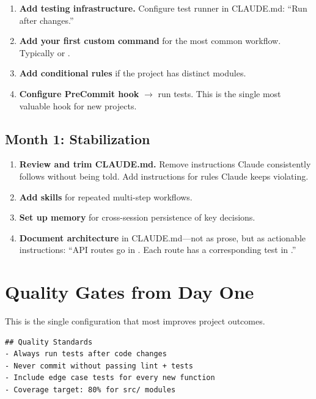\begin{enumerate}
  \item \textbf{Add testing infrastructure.}
    Configure test runner in CLAUDE.md: ``Run  after changes.''
  \item \textbf{Add your first custom command} for the most common workflow.
    Typically  or .
  \item \textbf{Add conditional rules} if the project has distinct modules.
  \item \textbf{Configure PreCommit hook} $\rightarrow$ run tests.
    This is the single most valuable hook for new projects.
\end{enumerate}

\subsection{Month 1: Stabilization}

\begin{enumerate}
  \item \textbf{Review and trim CLAUDE.md.}
    Remove instructions Claude consistently follows without being told.
    Add instructions for rules Claude keeps violating.
  \item \textbf{Add skills} for repeated multi-step workflows.
  \item \textbf{Set up memory} for cross-session persistence of key decisions.
  \item \textbf{Document architecture} in CLAUDE.md---not as prose,
    but as actionable instructions: ``API routes go in .
    Each route has a corresponding test in .''
\end{enumerate}


\section{Quality Gates from Day One}
\label{sec:quality-gates}

This is the single configuration that most improves project outcomes.

\begin{verbatim}
## Quality Standards
- Always run tests after code changes
- Never commit without passing lint + tests
- Include edge case tests for every new function
- Coverage target: 80% for src/ modules
\end{verbatim}

